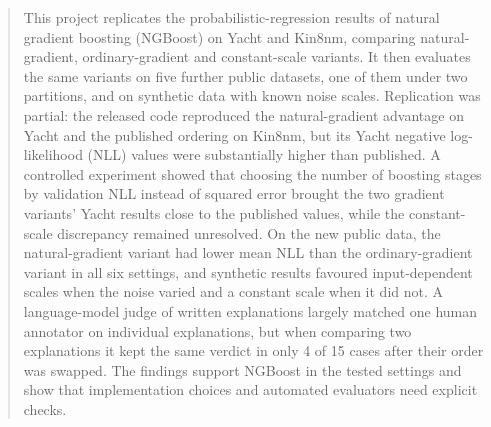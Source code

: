 \begin{abstract}
This project replicates the probabilistic-regression results of natural gradient boosting (NGBoost) on Yacht and Kin8nm, comparing natural-gradient, ordinary-gradient and constant-scale variants.
It then evaluates the same variants on five further public datasets, one of them under two partitions, and on synthetic data with known noise scales.
Replication was partial: the released code reproduced the natural-gradient advantage on Yacht and the published ordering on Kin8nm, but its Yacht negative log-likelihood (NLL) values were substantially higher than published.
A controlled experiment showed that choosing the number of boosting stages by validation NLL instead of squared error brought the two gradient variants' Yacht results close to the published values, while the constant-scale discrepancy remained unresolved.
On the new public data, the natural-gradient variant had lower mean NLL than the ordinary-gradient variant in all six settings, and synthetic results favoured input-dependent scales when the noise varied and a constant scale when it did not.
A language-model judge of written explanations largely matched one human annotator on individual explanations, but when comparing two explanations it kept the same verdict in only 4 of 15 cases after their order was swapped.
The findings support NGBoost in the tested settings and show that implementation choices and automated evaluators need explicit checks.
\end{abstract}
